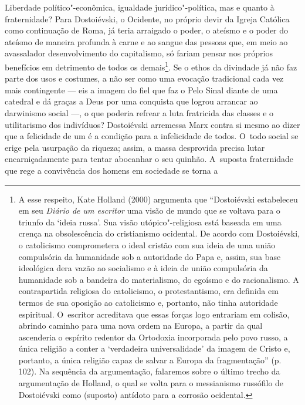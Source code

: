 Liberdade político"-econômica, igualdade jurídico"-política, mas e quanto
à fraternidade? Para Dostoiévski, o Ocidente, no próprio devir da Igreja
Católica como continuação de Roma, já teria arraigado o poder, o ateísmo
e o poder do ateísmo de maneira profunda à carne e ao sangue das pessoas
que, em meio ao avassalador desenvolvimento do capitalismo, só fariam
pensar nos próprios benefícios em detrimento de todos os
demais\footnote{A esse respeito, Kate Holland (2000) argumenta que
  ``Dostoiévski estabeleceu em seu \emph{Diário de um escritor} uma
  visão de mundo que se voltava para o triunfo da `ideia russa'. Sua
  visão utópico"-religiosa está baseada em uma crença na obsolescência do
  cristianismo ocidental. De acordo com Dostoiévski, o catolicismo
  comprometera o ideal cristão com sua ideia de uma união compulsória da
  humanidade sob a autoridade do Papa e, assim, sua base ideológica dera
  vazão ao socialismo e à ideia de união compulsória da humanidade sob a
  bandeira do materialismo, do egoísmo e do racionalismo. A
  contrapartida religiosa do catolicismo, o protestantismo, era definida
  em termos de sua oposição ao catolicismo e, portanto, não tinha
  autoridade espiritual. O~escritor acreditava que essas forças logo
  entrariam em colisão, abrindo caminho para uma nova ordem na Europa, a
  partir da qual ascenderia o espírito redentor da Ortodoxia incorporada
  pelo povo russo, a única religião a conter a `verdadeira
  universalidade' da imagem de Cristo e, portanto, a única religião
  capaz de salvar a Europa da fragmentação'' (p. 102). Na sequência da
  argumentação, falaremos sobre o último trecho da argumentação de
  Holland, o qual se volta para o messianismo russófilo de Dostoiévski
  como (suposto) antídoto para a corrosão ocidental.}. Se o ethos da
divindade já não faz parte dos usos e costumes, a não ser como uma
evocação tradicional cada vez mais contingente --- eis a imagem do fiel
que faz o Pelo Sinal diante de uma catedral e dá graças a Deus por uma
conquista que logrou arrancar ao darwinismo social ---, o que poderia
refrear a luta fratricida das classes e o utilitarismo dos indivíduos?
Dostoiévski arremessa Marx contra si mesmo ao dizer que a felicidade de
um é a condição para a infelicidade de todos. O~todo social se erige
pela usurpação da riqueza; assim, a massa desprovida precisa lutar
encarniçadamente para tentar abocanhar o seu quinhão. A~suposta
fraternidade que rege a convivência dos homens em sociedade se torna a
